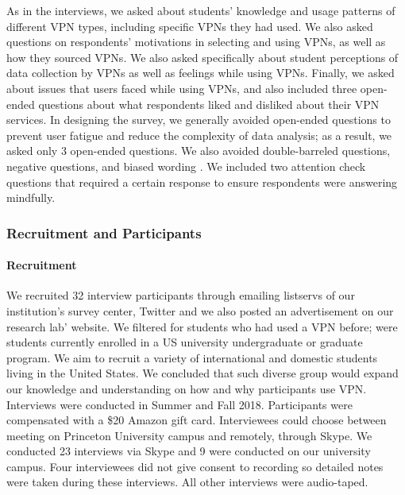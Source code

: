 As in the interviews, we asked about students’ knowledge and usage
patterns of different VPN types, including specific VPNs they had used. We
also asked questions on respondents’ motivations in selecting and using VPNs,
as well as how they sourced VPNs. We also asked specifically about student
perceptions of data collection by VPNs as well as feelings while using VPNs.
Finally, we asked about issues that users faced while using VPNs, and also
included three open-ended questions about what respondents liked and disliked
about their VPN services.  In designing the survey, we generally avoided
open-ended questions to prevent user fatigue and reduce the complexity of data
analysis; as a result, we asked only 3 open-ended questions. We also avoided
double-barreled questions, negative questions, and biased wording
\cite{lazar_28}. We included two attention check questions that required a
certain response to ensure respondents were answering mindfully. 

\subsubsection{Recruitment and Participants} 

\paragraph{Recruitment}
We recruited 32 interview participants through emailing listservs of our
institution's survey center, Twitter and we also posted an advertisement on
our research lab' website. We filtered for students who had used a VPN before;
were students currently enrolled in a US university undergraduate or graduate
program.  We aim to recruit a variety of international and domestic students
living in the United States.  We concluded that such diverse group would
expand our knowledge and understanding on how and why participants use VPN.
Interviews were conducted in Summer and Fall 2018. Participants were
compensated with a \$20 Amazon gift card.  Interviewees could choose between
meeting on Princeton University campus and remotely, through Skype. We
conducted 23 interviews via Skype and 9 were conducted on our university
campus.  Four interviewees did not give consent to recording so detailed notes
were taken during these interviews. All other interviews were audio-taped.

